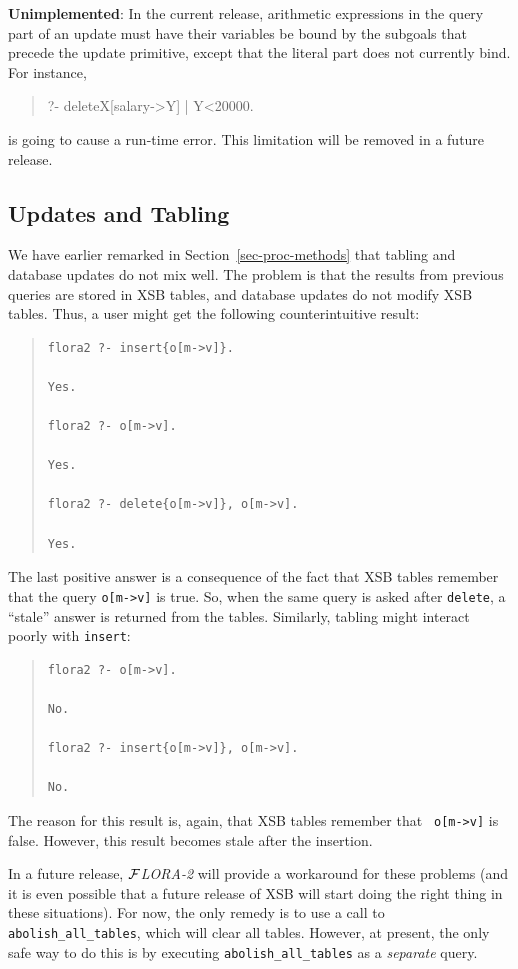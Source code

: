 \documentclass[11pt]{article}
\newcommand{\FLORA}{{\mbox{${\cal F}${\small\it LORA}\rm\emph{-2}}}\xspace}
\begin{document}
{\bf Unimplemented}: In the current release, arithmetic expressions in the
query part of an update must have their variables be bound by the subgoals
that precede the update primitive, except that the literal part does not
currently bind. For instance, 
\begin{quote}
 ?- delete{X[salary->Y] | Y<20000}.  
\end{quote}
is going to cause a run-time error. This limitation will be removed in a
future release.


\subsection{Updates and Tabling}


We have earlier remarked in Section~\ref{sec-proc-methods} that tabling and
database updates do not mix well.  The problem is that the results from
previous queries are stored in XSB tables, and database updates do not
modify XSB tables.  Thus, a user might get the following counterintuitive
result:
\begin{quote}
\begin{verbatim}
flora2 ?- insert{o[m->v]}.

Yes.

flora2 ?- o[m->v].

Yes.

flora2 ?- delete{o[m->v]}, o[m->v].

Yes.
\end{verbatim}
\end{quote}
The last positive answer is a consequence of the fact that XSB tables remember
that the query {\tt o[m->v]} is true. So, when the same query is asked
after {\tt delete}, a ``stale'' answer is returned from the tables. Similarly,
tabling might interact poorly with {\tt insert}:
\begin{quote}
\begin{verbatim}
flora2 ?- o[m->v].

No.

flora2 ?- insert{o[m->v]}, o[m->v].

No.
\end{verbatim}
\end{quote}
The reason for this result is, again, that XSB tables remember that {\tt
  o[m->v]} is false. However, this result becomes stale after the
  insertion.

In a future release, \FLORA will provide a workaround for these
problems (and it is even possible that a future release of XSB will
start doing the right thing in these situations). For now, the only
remedy is to use a call to {\tt abolish\_all\_tables}, which will
clear all tables.  However, at present, the only safe way to do this
is by executing {\tt abolish\_all\_tables} as a \emph{separate} query.
\end{document}
